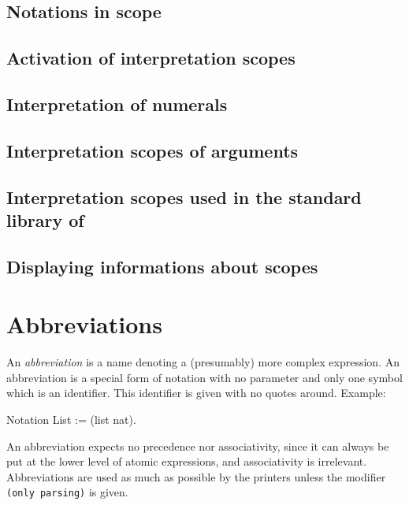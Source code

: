\subsection{Notations in scope}

\subsection{Activation of interpretation scopes}


\subsection{Interpretation of numerals}

\subsection{Interpretation scopes of arguments}

\subsection{Interpretation scopes used in the standard library of {\Coq}}


\subsection{Displaying informations about scopes}


\section{Abbreviations}
\label{Abbreviations}

An {\em abbreviation} is a name denoting a (presumably) more complex
expression. An abbreviation is a special form of notation with no
parameter and only one symbol which is an identifier. This identifier
is given with no quotes around. Example:

\begin{coq_example*}
Notation List := (list nat).
\end{coq_example*}

An abbreviation expects no precedence nor associativity, since it can
always be put at the lower level of atomic expressions, and
associativity is irrelevant. Abbreviations are used as much as
possible by the {\Coq} printers unless the modifier
\verb=(only parsing)= is given.

